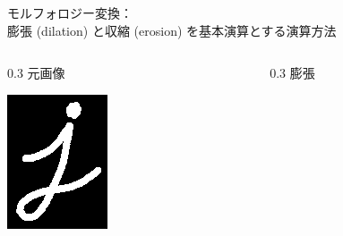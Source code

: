\documentclass[10pt]{beamer}
\begin{document}
	\begin{frame}{モルフォロジー変換：\\膨張 (dilation) と収縮 (erosion) を基本演算とする演算方法}
	    \begin{columns}
	        \begin{column}[c]{0.3\hsize}\centering
	            元画像\par
    	        \includegraphics[width=0.9\hsize]{figs/morph_src.png}
	        \end{column}
	        \begin{column}[c]{0.3\hsize}\centering
	            膨張\par

\end{column}
\end{columns}
\end{frame}
\end{document}
